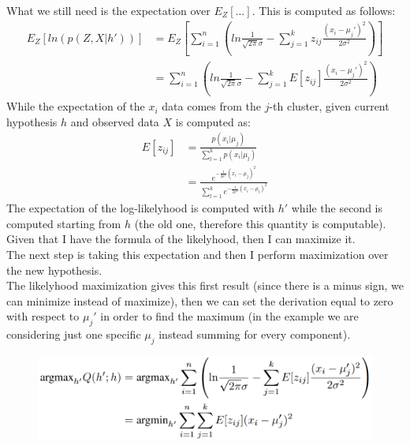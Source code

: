             What we still need is the expectation over $E_Z[\dots]$. This is computed as follows: 
            \begin{align*}
                E_Z [ln ( p (Z, X| h'))] & = E_Z 
                                            \left[ \sum _{i=1} ^ n \left(
                                            ln \frac{1}{\sqrt{2 \pi} \sigma}
                                            - \sum _{j=1} ^k z_{ij}
                                                \frac{(x_i - \mu_j ' )^2}{2 \sigma ^ 2}
                                            \right) \right]\\
                                        & = \sum _{i = 1} ^ n 
                                        \left( 
                                        ln \frac{1}{\sqrt{2 \pi} \sigma}
                                        - \sum _{j=1} ^k E [z_{ij}]
                                                \frac{(x_i - \mu_j ' )^2}{2 \sigma ^ 2}
                                        \right)
            \end{align*}    
            While the expectation of the $x_i$ data comes from the $j$-th cluster, given current hypothesis $h$ and observed data $X$ is computed as:
            \begin{align*}
                E[z_{ij}]   &= \frac{p(x_i | \mu_j)}{\sum _{l=1} ^ k p(x_i | \mu_l)}\\
                            &= 
                            \frac   {e^{- \frac{1}{2 \sigma^ 2} (x_i -\mu_j)^2 }}
                                    { \sum _{l=1} ^ k e^{- \frac{1}{2 \sigma^ 2} (x_i - \mu_l)^2 }}
            \end{align*}
            The expectation of the log-likelyhood is computed with $h'$ while the second is computed starting from $h$ (the old one, therefore this quantity is computable). Given that I have the formula of the likelyhood, then I can maximize it.\\
            The next step is taking this expectation and then I perform maximization over the new hypothesis. \\
            The likelyhood maximization gives this first result (since there is a minus sign, we can minimize instead of maximize), then we can set the derivation equal to zero with respect to $\mu_j '$ in order to find the maximum (in the example we are considering just one specific $\mu_j$ instead summing for every component).
            \begin{figure} [ht]
                \centering
                \includegraphics[scale=0.4]{images/m-step_GMM_maximization.png}
            \end{figure}

